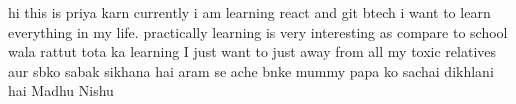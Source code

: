 hi this is priya karn
currently i am learning react and git
btech 
i want to learn everything in my life. practically learning is very interesting as compare to school wala rattut tota ka learning
I just want to just away from all my toxic relatives aur sbko sabak sikhana hai aram se ache bnke mummy papa ko sachai dikhlani hai
Madhu 
Nishu

